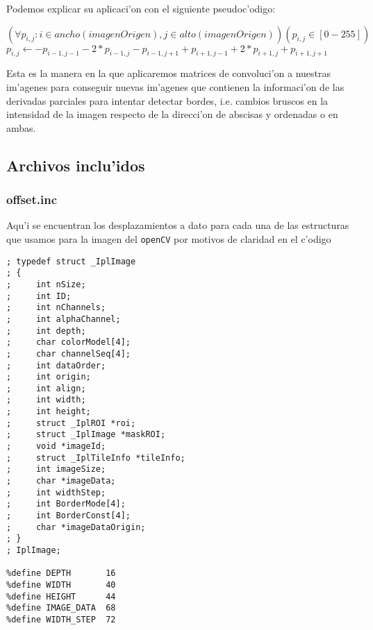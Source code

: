\documentclass[11pt]{article}
\begin{document}
Podemos explicar su aplicaci'on con el siguiente pseudoc'odigo:

 \begin{algorithmic}[1]
\STATE $(\forall p_{i,j} : i \in ancho(imagenOrigen), j \in alto(imagenOrigen))(p_{i,j} \in [0-255])$
\STATE $p_{i,j} \leftarrow -p_{i-1,j-1} - 2 * p_{i-1,j} - p_{i-1,j+1} +p_{i+1,j-1} + 2 * p_{i+1,j} + p_{i+1,j+1}$\label{lin:linea_asignapixel}
\ENDFOR
\ENDFOR
 \end{algorithmic}

Esta es la manera en la que aplicaremos matrices de convoluci'on a nuestras im'agenes para conseguir nuevas im'agenes que contienen la informaci'on de las derivadas parciales para intentar detectar bordes, i.e. cambios bruscos en la intensidad de la imagen respecto de la direcci'on de abscisas y ordenadas o en ambas.

\subsection{Archivos inclu'idos}
\subsubsection{offset.inc}
Aqu'i se encuentran los desplazamientos a dato para cada una de las estructuras que usamos para la imagen del \verb-openCV- por motivos de claridad en el c'odigo
\begin{lstlisting}[frame=single]
; typedef struct _IplImage
; {
;     int nSize;
;     int ID;
;     int nChannels;
;     int alphaChannel;
;     int depth;
;     char colorModel[4];
;     char channelSeq[4];
;     int dataOrder;
;     int origin;
;     int align;
;     int width;
;     int height;
;     struct _IplROI *roi;
;     struct _IplImage *maskROI;
;     void *imageId;
;     struct _IplTileInfo *tileInfo;
;     int imageSize;
;     char *imageData;
;     int widthStep;
;     int BorderMode[4];
;     int BorderConst[4];
;     char *imageDataOrigin;
; }
; IplImage;

%define DEPTH		16
%define WIDTH		40
%define HEIGHT		44
%define IMAGE_DATA 	68
%define WIDTH_STEP	72
\end{lstlisting}
\end{document}
